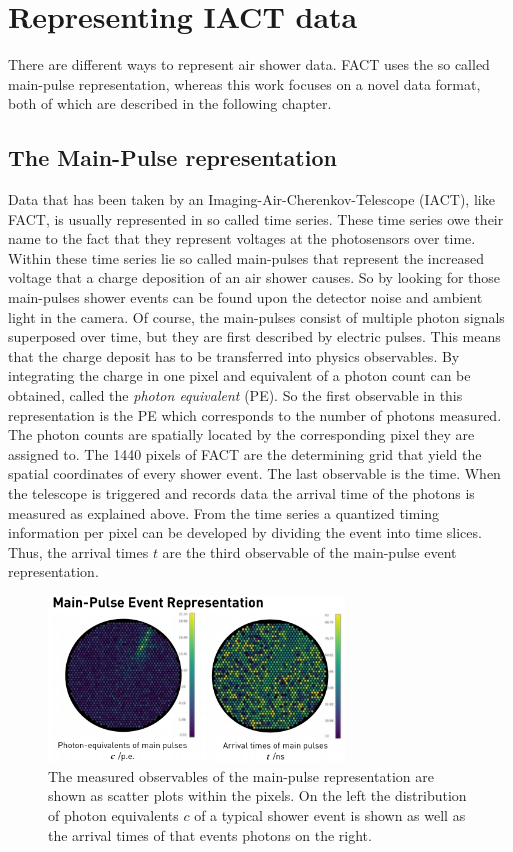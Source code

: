 \chapter{Representing IACT data}

There are different ways to represent air shower data. FACT uses the so called main-pulse representation, whereas this work focuses on a novel data format, both of which are described in the following chapter.

\section{The Main-Pulse representation}
Data that has been taken by an Imaging-Air-Cherenkov-Telescope
(IACT), like FACT, is usually represented in so called time series.
These time series owe their name to the fact that they represent voltages at the photosensors over time. Within these time series lie so called main-pulses that represent the increased voltage that a charge deposition of an air shower causes. So by looking for those main-pulses shower events can be found upon the detector noise and ambient light in the camera. Of course, the main-pulses consist of multiple photon signals superposed over time, but they are first described by electric pulses. This means that the charge deposit has to be transferred into physics observables. By integrating the charge in one pixel and equivalent of a photon count can be obtained, called the \textit{photon equivalent} (PE). So the first observable in this representation is the PE which corresponds to the number of photons measured. The photon counts are spatially located by the corresponding pixel they are assigned to. The 1440 pixels of FACT are the determining grid that yield the spatial coordinates of every shower event. The last observable is the time. When the telescope is triggered and records data the arrival time of the photons is measured as explained above. From the time series a quantized timing information per pixel can be developed by dividing the event into time slices. Thus, the arrival times $t$ are the third observable of the main-pulse event representation.

\begin{figure}
  \centering
  \includegraphics[width=0.7\textwidth]{Plots/standard.png}
  \caption{The measured observables of the main-pulse representation are shown as scatter plots within the pixels. On the left the distribution of photon equivalents $c$ of a typical shower event is shown as well as the arrival times of that events photons on the right.}
  \label{fig:mainpulse}
\end{figure}

